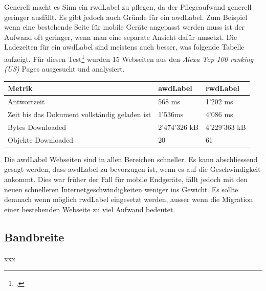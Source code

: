 Generell macht es Sinn ein \gls{rwdLabel} zu pflegen, da der Pflegeaufwand generell geringer ausfällt. Es gibt jedoch auch Gründe für ein \gls{awdLabel}. Zum Beispiel wenn eine bestehende Seite für mobile Geräte angepasst werden muss ist der Aufwand oft geringer, wenn man eine separate Ansicht dafür umsetzt. Die Ladezeiten für ein \gls{awdLabel} sind meistens auch besser, was folgende Tabelle aufzeigt. 
Für diesen Test\footcite{Adaptive_vs_Responsive_Web_Design_Which_Is_Right_for_Your_Site_-_Catchpoints_Blog_2015-06-01} wurden 15 Webseiten aus den \textit{Alexa Top 100 ranking (US)} Pages ausgesucht und analysiert.

\begin{center}
    \begin{tabular}{ | l | l | l |}
    \hline
    Metrik & \gls{awdLabel} & \gls{rwdLabel} \\ \hline
    Antwortzeit & 568 ms & 1'202 ms \\ \hline
    Zeit bis das Dokument vollständig geladen ist & 1'536ms & 4'086 ms \\ \hline
	Bytes Downloaded & 2'474'326 kB & 4'229'363 kB \\ \hline
	Objekte Downloaded & 20 & 61 \\ \hline
    \end{tabular}
\end{center}

Die \gls{awdLabel} Webseiten sind in allen Bereichen schneller. Es kann abschliessend gesagt werden, dass \gls{awdLabel} zu bevorzugen ist, wenn es auf die Geschwindigkeit ankommt. Dies war früher der Fall für mobile Endgeräte, fällt jedoch mit den neuen schnelleren Internetgeschwindigkeiten weniger ins Gewicht. Es sollte demnach wenn möglich \gls{rwdLabel} eingesetzt werden, ausser wenn die Migration einer bestehenden Webseite zu viel Aufwand bedeutet.


\subsection{Bandbreite}
\label{sec:requirementsengineerin:endgeraete:bandbreite}
xxx